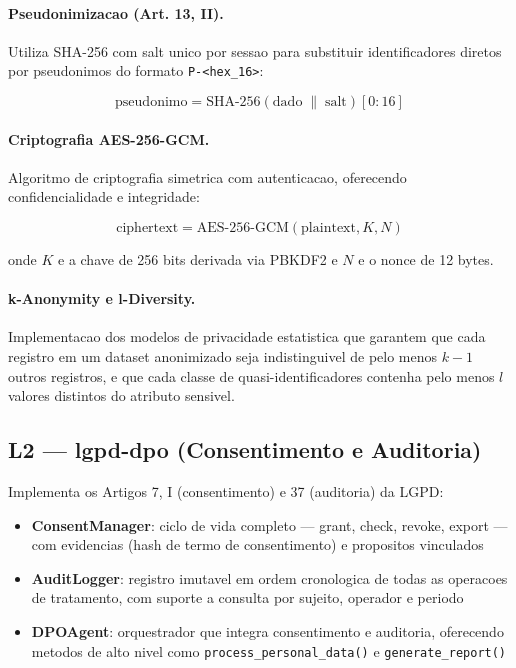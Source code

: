 \documentclass[5p]{elsarticle}
\begin{document}
\paragraph{Pseudonimizacao (Art. 13, II).} Utiliza SHA-256 com salt unico por sessao para
substituir identificadores diretos por pseudonimos do formato \texttt{P-<hex\_16>}:

\begin{equation}
    \text{pseudonimo} = \text{SHA-256}(\text{dado} \;\|\; \text{salt})[0:16]
\end{equation}

\paragraph{Criptografia AES-256-GCM.} Algoritmo de criptografia simetrica com autenticacao,
oferecendo confidencialidade e integridade:

\begin{equation}
    \text{ciphertext} = \text{AES-256-GCM}(\text{plaintext}, K, N)
\end{equation}

onde $K$ e a chave de 256 bits derivada via PBKDF2 e $N$ e o nonce de 12 bytes.

\paragraph{k-Anonymity e l-Diversity.} Implementacao dos modelos de privacidade estatistica
que garantem que cada registro em um dataset anonimizado seja indistinguivel de pelo menos
$k-1$ outros registros, e que cada classe de quasi-identificadores contenha pelo menos $l$
valores distintos do atributo sensivel.

\subsection{L2 --- lgpd-dpo (Consentimento e Auditoria)}
\label{sec:l2}

Implementa os Artigos 7\degree, I (consentimento) e 37 (auditoria) da LGPD:

\begin{itemize}
    \item \textbf{ConsentManager}: ciclo de vida completo --- grant, check, revoke, export ---
    com evidencias (hash de termo de consentimento) e propositos vinculados
    \item \textbf{AuditLogger}: registro imutavel em ordem cronologica de todas as operacoes
    de tratamento, com suporte a consulta por sujeito, operador e periodo
    \item \textbf{DPOAgent}: orquestrador que integra consentimento e auditoria, oferecendo
    metodos de alto nivel como \texttt{process\_personal\_data()} e \texttt{generate\_report()}
\end{itemize}
\end{document}
